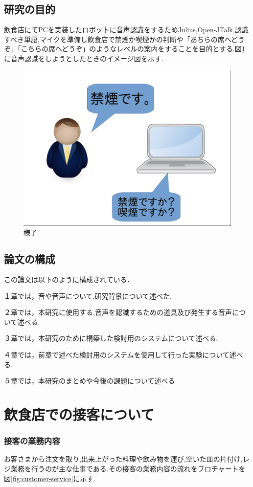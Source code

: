 \documentclass[12pt,oneside]{sotsuken_paper}
\begin{document}
\section{研究の目的}
飲食店にてPCを実装したロボットに音声認識をするためJulius,Open-JTalk,認識すべき単語,マイクを準備し飲食店で禁煙か喫煙かの判断や「あちらの席へどうぞ」「こちらの席へどうぞ」のようなレベルの案内をすることを目的とする.図\ref{fig:yousu}に音声認識をしようとしたときのイメージ図を示す.
\begin{figure}[htbp]
\begin{center}
\includegraphics[width=120mm]{img/Image.png}
\caption{様子}
\label{fig:yousu}
\end{center}
\end{figure}
\section{論文の構成}
この論文は以下のように構成されている．


１章では，音や音声について,研究背景について述べた.


２章では，本研究に使用する,音声を認識するための道具及び発生する音声について述べる.


３章では，本研究のために構築した検討用のシステムについて述べる.


４章では，前章で述べた検討用のシステムを使用して行った実験について述べる.


５章では，本研究のまとめや今後の課題について述べる.
\chapter{飲食店での接客について}
\subsection{接客の業務内容}
お客さまから注文を取り,出来上がった料理や飲み物を運び,空いた皿の片付け,レジ業務を行うのが主な仕事である.その接客の業務内容の流れをフロチャートを図\ref{fig:customer-service}に示す.
\end{document}
